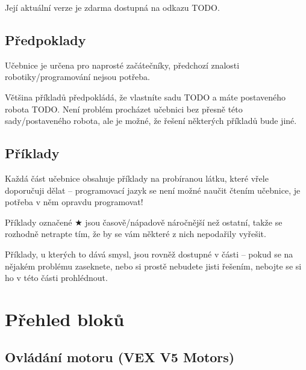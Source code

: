 Její aktuální verze je zdarma dostupná na odkazu TODO.

\subsection{Předpoklady}
Učebnice je určena pro naprosté začátečníky, předchozí znalosti robotiky/programování nejsou potřeba.

Většina příkladů předpokládá, že vlastníte sadu TODO a máte postaveného robota TODO. Není problém procházet učebnici bez přesně této sady/postaveného robota, ale je možné, že řešení některých příkladů bude jiné.

\subsection{Příklady}
Každá část učebnice obsahuje příklady na probíranou látku, které vřele doporučuji dělat -- programovací jazyk se není možné naučit čtením učebnice, je potřeba v něm opravdu programovat!

Příklady označené $\bigstar$ jsou časově/nápadově náročnější než ostatní, takže se rozhodně netrapte tím, že by se vám některé z nich nepodařily vyřešit.

Příklady, u kterých to dává smysl, jsou rovněž dostupné v části  -- pokud se na nějakém problému zaseknete, nebo si prostě nebudete jisti řešením, nebojte se si ho v této části prohlédnout.

\errata

\newpage

\setcounter{secnumdepth}{3}

\newpage

\newpage

\newpage

\newpage

\newpage

\newpage

\newpage
\setcounter{secnumdepth}{0}

\newcommand{\where}[1]{{\normalfont (#1)}}

\section{Přehled bloků}

\subsection{Ovládání motoru \where{VEX V5 Motors}}
\begin{itemize}
	\blockMotorStart
	\blockMotorStop
	\blockMotorDistance
	\blockMotorVelocity
\end{itemize}

